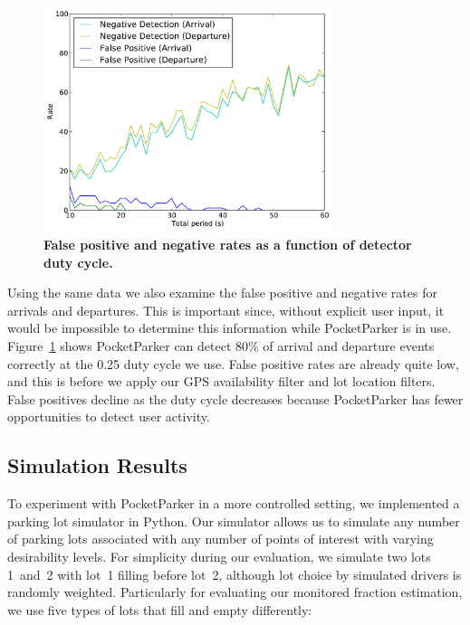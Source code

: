 \begin{figure}
\centering
\includegraphics[width=3.325in]{./figures/Rate_FP_and_ND.pdf}

\caption{\textbf{False positive and negative rates as a function of detector
duty cycle.}} 

\label{fig-falsepositives}
\end{figure}

Using the same data we also examine the false positive and negative rates for
arrivals and departures. This is important since, without explicit user
input, it would be impossible to determine this information while
PocketParker is in use. Figure~\ref{fig-falsepositives} shows PocketParker
can detect 80\% of arrival and departure events correctly at the 0.25 duty
cycle we use. False positive rates are already quite low, and this is before
we apply our GPS availability filter and lot location filters. False
positives decline as the duty cycle decreases because PocketParker has fewer
opportunities to detect user activity.

\subsection{Simulation Results}
\label{subsec-simulator}

To experiment with PocketParker in a more controlled setting, we implemented
a parking lot simulator in Python. Our simulator allows us to simulate any
number of parking lots associated with any number of points of interest with
varying desirability levels. For simplicity during our evaluation, we
simulate two lots 1~and~2 with lot~1 filling before lot~2, although lot
choice by simulated drivers is randomly weighted. Particularly for evaluating
our monitored fraction estimation, we use five types of lots that fill and
empty differently:

